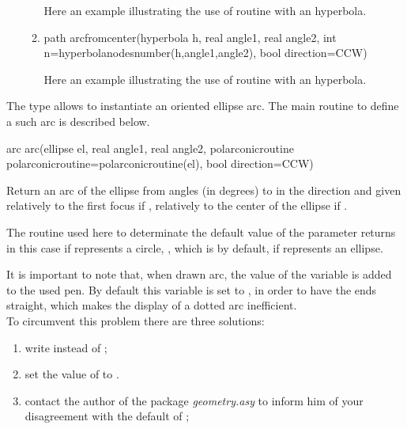 \documentclass[pdftex]{article}
\newcommand{\geo}{the package \emph{geometry.asy}\xspace}
\begin{document}
\begin{itemize}
\begin{enumerate}
    Here an example illustrating the use of routine
     with an hyperbola.
  \item {}
    \begin{Vcolor}
      path arcfromcenter(hyperbola h, real angle1, real angle2,
      int n=hyperbolanodesnumber(h,angle1,angle2), bool direction=CCW)
    \end{Vcolor}
    Here an example illustrating the use of routine
     with an hyperbola.
  \end{enumerate}
\end{itemize}

The type  allows to instantiate an oriented ellipse
arc. The main routine to define a such arc is described
below.
\begin{Vcolor}
  arc arc(ellipse el, real angle1, real angle2,
  polarconicroutine polarconicroutine=polarconicroutine(el),
  bool direction=CCW)
\end{Vcolor}
Return an arc of the ellipse  from angles (in
degrees)  to  in the
direction  and given relatively to the first focus
if , relatively to the center of
the ellipse if .

The routine %
 used here to determinate the default
value of the parameter  returns in this case
 if  represents a circle,
, which is  by default,
if  represents an ellipse.

It is important to note that, when drawn arc, the value of the
variable  is added to the used
pen. By default this variable is set to , in order to
have the ends straight, which makes the display of a dotted arc inefficient.\\
To circumvent this problem there are three solutions:
\begin{enumerate}
\item write  instead of
  ;
\item set the value of  to .
\item contact the author of \geo to inform him of your disagreement
  with the default of ;
\end{enumerate}
\end{document}
